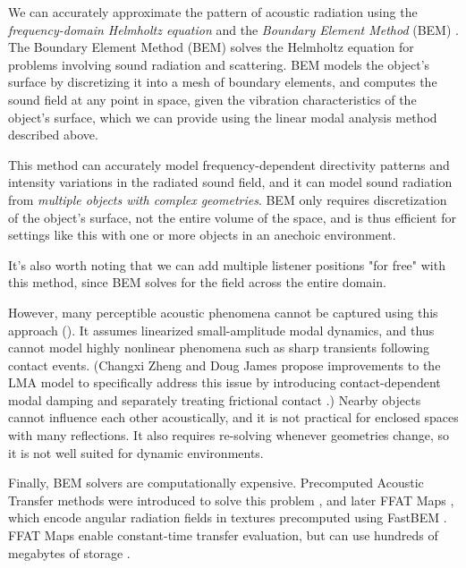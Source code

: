 \documentclass[12pt]{article}
\begin{document}
We can accurately approximate the pattern of acoustic radiation using the \textit{frequency-domain Helmholtz equation} and the \textit{Boundary Element Method} (BEM) \cite{wang_wbss_2018}.
The Boundary Element Method (BEM) solves the Helmholtz equation for problems involving sound radiation and scattering.
BEM models the object's surface by discretizing it into a mesh of boundary elements, and computes the sound field at any point in space, given the vibration characteristics of the object's surface, which we can provide using the linear modal analysis method described above.

This method can accurately model frequency-dependent directivity patterns and intensity variations in the radiated sound field, and it can model sound radiation from \textit{multiple objects with complex geometries}.
BEM only requires discretization of the object's surface, not the entire volume of the space, and is thus efficient for settings like this with one or more objects in an anechoic environment.

It's also worth noting that we can add multiple listener positions "for free" with this method, since BEM solves for the field across the entire domain.

However, many perceptible acoustic phenomena cannot be captured using this approach (\cite{wang_wbss_2018}).
It assumes linearized small-amplitude modal dynamics, and thus cannot model highly nonlinear phenomena such as sharp transients following contact events.
(Changxi Zheng and Doug James propose improvements to the LMA model to specifically address this issue by introducing contact-dependent modal damping and separately treating frictional contact \cite{zheng_modal_contact_2011}.)
Nearby objects cannot influence each other acoustically, and it is not practical for enclosed spaces with many reflections.
It also requires re-solving whenever geometries change, so it is not well suited for dynamic environments.

Finally, BEM solvers are computationally expensive.
Precomputed Acoustic Transfer methods were introduced to solve this problem \cite{james_precomputed_acoustic_2006}, and later FFAT Maps \cite{chadwick_harmonic_shells_2009}, which encode angular radiation fields in textures precomputed using FastBEM \cite{liu_fast_multipole_bem_2009}.
FFAT Maps enable constant-time transfer evaluation, but can use hundreds of megabytes of storage \cite{wang_kleinpat_2019}.
\end{document}
